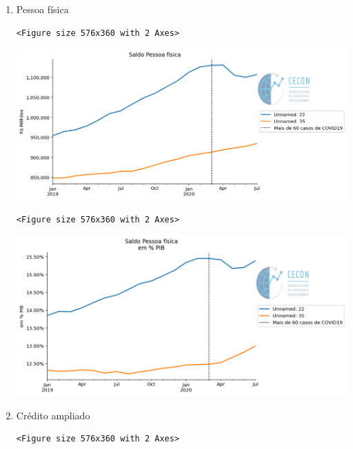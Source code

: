 \documentclass[11pt]{article}
\begin{document}
\begin{enumerate}
\item Pessoa física
\label{sec:orgf30bca5}

\begin{verbatim}
<Figure size 576x360 with 2 Axes>
\end{verbatim}


\begin{center}
\includegraphics[width=.9\linewidth]{obipy-resources/62e383af79e91b63c7fc98dd7fb55b3c3ececcb9/c5ebb89c192628d7cec923eb13d6356df012028a.png}
\end{center}

\begin{verbatim}
<Figure size 576x360 with 2 Axes>
\end{verbatim}


\begin{center}
\includegraphics[width=.9\linewidth]{obipy-resources/62e383af79e91b63c7fc98dd7fb55b3c3ececcb9/b694dfa6b6aa8de15c823bc95e21ec965d607fee.png}
\end{center}

\item Crédito ampliado
\label{sec:org3ae77ba}

\begin{verbatim}
<Figure size 576x360 with 2 Axes>
\end{verbatim}



\end{enumerate}
\end{document}
